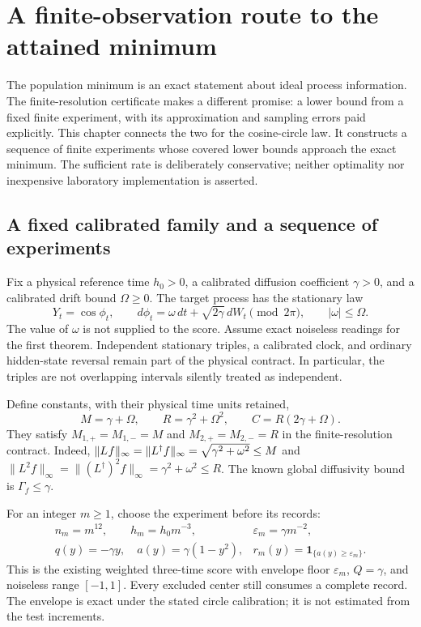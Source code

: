 \chapter{A finite-observation route to the attained minimum}
\label{ch:og-consistency}

The population minimum is an exact statement about ideal process information.
The finite-resolution certificate makes a different promise: a lower bound
from a fixed finite experiment, with its approximation and sampling errors
paid explicitly. This chapter connects the two for the cosine-circle law.
It constructs a sequence of finite experiments whose covered lower bounds
approach the exact minimum. The sufficient rate is deliberately conservative;
neither optimality nor inexpensive laboratory implementation is asserted.

\section{A fixed calibrated family and a sequence of experiments}

Fix a physical reference time $h_0>0$, a calibrated diffusion coefficient
$\gamma>0$, and a calibrated drift bound $\Omega\geq0$. The target process
has the stationary law
\[
 Y_t=\cos\phi_t,\qquad
 d\phi_t=\omega\,dt+\sqrt{2\gamma}\,dW_t\pmod{2\pi},
 \qquad |\omega|\leq\Omega.
\]
The value of $\omega$ is not supplied to the score. Assume exact noiseless
readings for the first theorem. Independent stationary triples, a calibrated
clock, and ordinary hidden-state reversal remain part of the physical
contract. In particular, the triples are not overlapping intervals silently
treated as independent.

Define constants, with their physical time units retained,
\begin{equation}
 M=\gamma+\Omega,\qquad R=\gamma^2+\Omega^2,\qquad
 C=R(2\gamma+\Omega).
 \label{eq:og-consistency-calibration}
\end{equation}
They satisfy $M_{1,+}=M_{1,-}=M$ and $M_{2,+}=M_{2,-}=R$ in the
finite-resolution contract. Indeed,
$\|L^{\vphantom\dagger}f\|_\infty
 =\|L^\dagger f\|_\infty=\sqrt{\gamma^2+\omega^2}\leq M$ and
$\|L^2f\|_\infty=\|(L^\dagger)^2f\|_\infty
 =\gamma^2+\omega^2\leq R$.
The known global diffusivity bound is $\Gamma_f\leq\gamma$.

For an integer $m\geq1$, choose the experiment before its records:
\begin{equation}
 \begin{aligned}
 n_m=m^{12},\qquad h_m=h_0m^{-3},\qquad
 &\varepsilon_m=\gamma m^{-2},\\
 q(y)=-\gamma y,
 \quad a(y)=\gamma(1-y^2),
 &r_m(y)=\mathbf 1_{\{a(y)\geq\varepsilon_m\}}.
 \end{aligned}
 \label{eq:og-consistency-design}
\end{equation}
This is the existing weighted three-time score with envelope floor
$\varepsilon_m$, $Q=\gamma$, and noiseless range $[-1,1]$.
Every excluded center still consumes a complete record. The envelope is
exact under the stated circle calibration; it is not estimated from the test
increments.

